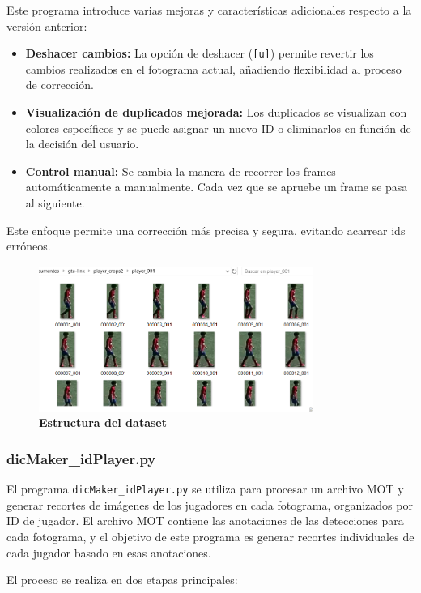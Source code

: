 \documentclass[12pt, a4paper, twoside]{article}
\begin{document}
	Este programa introduce varias mejoras y características adicionales respecto a la versión anterior:
	
	\begin{itemize}
		\item \textbf{Deshacer cambios:} La opción de deshacer (\texttt{[u]}) permite revertir los cambios realizados en el fotograma actual, añadiendo flexibilidad al proceso de corrección.
		\item \textbf{Visualización de duplicados mejorada:} Los duplicados se visualizan con colores específicos y se puede asignar un nuevo ID o eliminarlos en función de la decisión del usuario.
		\item \textbf{Control manual:} Se cambia la manera de recorrer los frames automáticamente a manualmente. Cada vez que se apruebe un frame se pasa al siguiente.
	\end{itemize}
	
	Este enfoque permite una corrección más precisa y segura, evitando acarrear ids erróneos.
	
	\begin{figure}[H]
		\centering
		\includegraphics[width=0.8\textwidth]{image/dir_reid}
		\caption{\textbf{Estructura del dataset}}
		\label{dir_reid}
	\end{figure}
	
	\subsubsection{dicMaker\_idPlayer.py}
	
	El programa \texttt{dicMaker\_idPlayer.py} se utiliza para procesar un archivo MOT y generar recortes de imágenes de los jugadores en cada fotograma, organizados por ID de jugador. El archivo MOT contiene las anotaciones de las detecciones para cada fotograma, y el objetivo de este programa es generar recortes individuales de cada jugador basado en esas anotaciones.
	
	El proceso se realiza en dos etapas principales:
	
\end{document}
